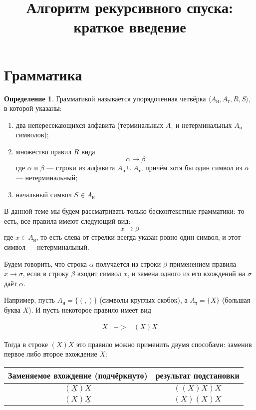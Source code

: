\documentclass[12pt]{article}
\begin{document}
\theoremstyle{definition}
\newtheorem{definition}{Определение}[section]

\title{Алгоритм рекурсивного спуска: краткое введение}

\maketitle

\section{Грамматика}

\begin{definition} Грамматикой называется упорядоченная четвёрка 
$\langle A_\textrm{н}, A_\textrm{т}, R, S \rangle$, в которой указаны:
\begin{enumerate}
\item два непересекающихся алфавита (терминальных
$A_\textrm{т}$ и нетерминальных $A_\textrm{н}$ символов);
\item множество правил $R$ вида 
$$\alpha\rightarrow\beta$$ где $\alpha$ и $\beta$ --- строки из алфавита
$A_\textrm{н} \cup A_\textrm{т}$, причём хотя бы один символ из $\alpha$ --- 
нетерминальный;
\item начальный символ $S \in A_\textrm{н}$.
\end{enumerate}
\end{definition}

\noindent В данной теме мы будем рассматривать только бесконтекстные грамматики: то есть,
все правила имеют следующий вид: $$x \rightarrow \beta$$
где $x \in A_\textrm{н}$, то есть слева от стрелки всегда указан ровно один символ,
и этот символ --- нетерминальный.

Будем говорить, что строка $\alpha$ получается из строки $\beta$ применением
правила $x \rightarrow \sigma$, если в строку $\beta$ входит символ $x$,
и замена одного из его вхождений на $\sigma$ даёт $\alpha$.

Например, пусть $A_\textrm{н} = \{(, )\}$ (символы круглых скобок),
а $A_\textrm{т} = \{X\}$ (большая буква $X$).
И пусть некоторое правило имеет вид
\begin{bnf}\begin{eqnarray*}
X &->& (X)X
\end{eqnarray*}\end{bnf}
Тогда в строке $(X)X$ это правило можно применить двумя способами: заменив 
первое либо второе вхождение $X$:

\vspace{0.2cm}\begin{tabular}{cc}
Заменяемое вхождение (подчёркнуто) & результат подстановки\\
\hline
$(\underline{X})X$ & $((X)X)X$ \\
$(X)\underline{X}$ & $(X)(X)X$
\end{tabular}\vspace{0.2cm}
\end{document}
